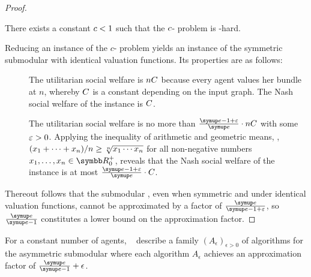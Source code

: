 \begin{proof}
	\begin{proposition}
		There exists a constant \(c < 1\) such that the \(c\)-\Gap{} problem is \NP\kern1.5pt-hard.
	\end{proposition}

	\medskip
	Reducing an instance of the \(c\)-\Gap{} problem yields an instance of the symmetric submodular \USW{} with identical valuation functions.
	Its properties are as follows:
	\begin{description}
		\item[\Yes]
		The utilitarian social welfare is \(n C\) because every agent values her bundle at \(n\), whereby \(C\) is a constant depending on the input graph.
		The Nash social welfare of the instance is \(C\).

		\item[\No]
		The utilitarian social welfare is no more than \(\afinv \cdot n \USWconstant\) with some \(\varepsilon > 0\).
		Applying the inequality of arithmetic and geometric means, \ie{}, \((x_1 + \dots + x_n)/n \ge \smash{\sqrt[n]{x_1 \dotsm x_n}}\) for all non-negative numbers \(x_1, \dots, x_n \in \realposzero\), reveals that the Nash social welfare of the instance is at most \(\afinv \cdot \USWconstant\).
	\end{description}
	Thereout follows that the submodular \NSW{}, even when symmetric and under identical valuation functions, cannot be approximated by a factor of \(\afconst\), so \(\af\) constitutes a lower bound on the approximation factor.
\end{proof}

For a constant number of agents, \citeauthor{APNSWuSVþUM}~\cite[Section 5.1]{APNSWuSVþUM} describe a family \((A_{\epsilon})_{\epsilon > 0}\) of algorithms for the asymmetric submodular \NSW{} where each algorithm \(A_\epsilon\) achieves an approximation factor of \(\af + \epsilon\).

